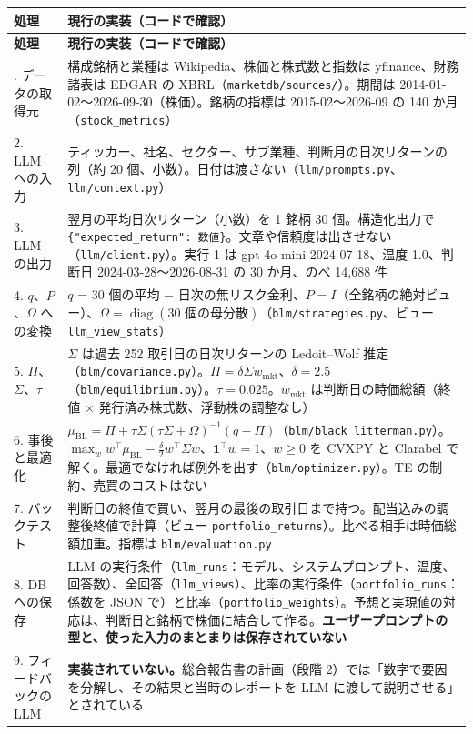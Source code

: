 \documentclass[xelatex,ja=standard,jafont=haranoaji,a4paper,10pt,openany]{bxjsreport}
\newcommand{\code}[1]{\texttt{#1}}
\newcommand{\T}{^{\top}}
\newcommand{\muBL}{\mu_{\mathrm{BL}}}
\newcommand{\wmkt}{w_{\mathrm{mkt}}}
\newcommand{\one}{\mathbf{1}}
\DeclareMathOperator{\diag}{diag}
\begin{document}
\begin{longtable}{p{3.4cm}p{11.5cm}}
\toprule
\textbf{処理} & \textbf{現行の実装（コードで確認）} \\
\midrule
\endfirsthead
\toprule
\textbf{処理} & \textbf{現行の実装（コードで確認）} \\
\midrule
\endhead
\bottomrule
\endfoot
1. データの取得元 & 構成銘柄と業種は Wikipedia、株価と株式数と指数は yfinance、財務諸表は EDGAR の XBRL（\code{marketdb/sources/}）。期間は 2014-01-02〜2026-09-30（株価）。銘柄の指標は 2015-02〜2026-09 の 140 か月（\code{stock\_metrics}） \\
2. LLM への入力 & ティッカー、社名、セクター、サブ業種、判断月の日次リターンの列（約 20 個、小数）。日付は渡さない（\code{llm/prompts.py}、\code{llm/context.py}） \\
3. LLM の出力 & 翌月の平均日次リターン（小数）を 1 銘柄 30 個。構造化出力で \code{\{"expected\_return": 数値\}}。文章や信頼度は出させない（\code{llm/client.py}）。実行 1 は gpt-4o-mini-2024-07-18、温度 1.0、判断日 2024-03-28〜2026-08-31 の 30 か月、のべ 14,688 件 \\
4. $q$、$P$、$\Omega$ への変換 & $q$ = 30 個の平均 $-$ 日次の無リスク金利、$P=I$（全銘柄の絶対ビュー）、$\Omega=\diag(\text{30 個の母分散})$（\code{blm/strategies.py}、ビュー \code{llm\_view\_stats}） \\
5. $\Pi$、$\Sigma$、$\tau$ & $\Sigma$ は過去 252 取引日の日次リターンの Ledoit--Wolf 推定（\code{blm/covariance.py}）。$\Pi=\delta\Sigma\wmkt$、$\delta=2.5$（\code{blm/equilibrium.py}）。$\tau=0.025$。$\wmkt$ は判断日の時価総額（終値 $\times$ 発行済み株式数、浮動株の調整なし） \\
6. 事後と最適化 & $\muBL=\Pi+\tau\Sigma(\tau\Sigma+\Omega)^{-1}(q-\Pi)$（\code{blm/black\_litterman.py}）。$\max_w w\T\muBL-\frac{\delta}{2}w\T\Sigma w$、$\one\T w=1$、$w\ge0$ を CVXPY と Clarabel で解く。最適でなければ例外を出す（\code{blm/optimizer.py}）。TE の制約、売買のコストはない \\
7. バックテスト & 判断日の終値で買い、翌月の最後の取引日まで持つ。配当込みの調整後終値で計算（ビュー \code{portfolio\_returns}）。比べる相手は時価総額加重。指標は \code{blm/evaluation.py} \\
8. DB への保存 & LLM の実行条件（\code{llm\_runs}：モデル、システムプロンプト、温度、回答数）、全回答（\code{llm\_views}）、比率の実行条件（\code{portfolio\_runs}：係数を JSON で）と比率（\code{portfolio\_weights}）。予想と実現値の対応は、判断日と銘柄で株価に結合して作る。\textbf{ユーザープロンプトの型と、使った入力のまとまりは保存されていない} \\
9. フィードバックの LLM & \textbf{実装されていない。}総合報告書の計画（段階 2）では「数字で要因を分解し、その結果と当時のレポートを LLM に渡して説明させる」とされている \\
\end{longtable}
\end{document}
